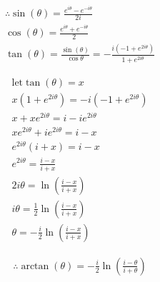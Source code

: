\documentclass{../../style}
\begin{document}
\eulerformula

\begin{gather*}
	\therefore \sin(\theta) = \frac{e^{i\theta} - e^{-i\theta}}{2i} \\
	\cos(\theta) = \frac{e^{i\theta} + e^{-i\theta}}{2} \\
	\tan(\theta) = \frac{\sin(\theta)}{\cos{\theta}} = -\frac{i(-1 + e^{2i\theta})}{1 + e^{2i\theta}}
\end{gather*}

\begin{gather*}
	\text{let} \tan(\theta) = x \\
	x(1 + e^{2i\theta}) = -i(-1 + e^{2i\theta}) \\
	x + xe^{2i\theta} = i - ie^{2i\theta} \\
	xe^{2i\theta} + ie^{2i\theta} = i - x \\
	e^{2i\theta}(i + x) = i - x \\
	e^{2i\theta} = \frac{i - x}{i + x} \\
	2i\theta = \ln(\frac{i - x}{i + x}) \\
	i\theta = \frac{1}{2}\ln(\frac{i - x}{i + x}) \\
	\theta = -\frac{i}{2}\ln(\frac{i - x}{i + x})
\end{gather*}

\begin{gather*}
	\therefore \arctan(\theta) = -\frac{i}{2}\ln(\frac{i - \theta}{i + \theta})
\end{gather*}
\end{document}
